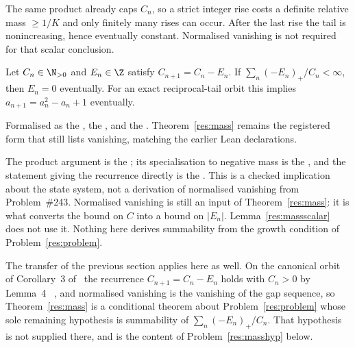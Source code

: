 \documentclass[11pt]{article}
\begin{document}
\noindent The same product already caps $C_n$, so a strict integer rise costs a
definite relative mass $\ge 1/K$ and only finitely many rises can occur.  After
the last rise the tail is nonincreasing, hence eventually constant.  Normalised
vanishing is not required for that scalar conclusion.

\begin{lemma}\label{res:massscalar}
Let \(C_n\in\N_{>0}\) and \(E_n\in\Z\) satisfy \(C_{n+1}=C_n-E_n\).  If
\(\sum_n(-E_n)_+/C_n<\infty\), then \(E_n=0\) eventually.  For an exact
reciprocal-tail orbit this implies \(a_{n+1}=a_n^2-a_n+1\) eventually.
\end{lemma}

\noindent Formalised as the
, the
, and the
.  Theorem~\ref{res:mass} remains the registered
form that still lists vanishing, matching the earlier Lean declarations.

\noindent The product argument is the
; its specialisation to negative mass is the
, and the statement giving the recurrence directly is
the
.  This is a checked implication about
the state system, not a derivation of normalised vanishing from
Problem~\#243.  Normalised vanishing is still an input of
Theorem~\ref{res:mass}: it is what converts the bound on $C$ into a bound on
$|E_n|$.  Lemma~\ref{res:massscalar} does not use it.  Nothing here derives
summability from the growth condition of Problem~\ref{res:problem}.

The transfer of the previous section applies here as well.  On the canonical
orbit of Corollary~3 of~\cite[p.~9]{koizumi2025} the recurrence
$C_{n+1}=C_n-E_n$ holds with $C_n>0$ by Lemma~4
~\cite[p.~11]{koizumi2025}, and normalised vanishing is the vanishing of
the gap sequence, so Theorem~\ref{res:mass} is a conditional theorem about
Problem~\ref{res:problem} whose sole remaining hypothesis is summability of
$\sum_n(-E_n)_+/C_n$.  That hypothesis is not supplied there, and is the
content of Problem~\ref{res:masshyp} below.
\end{document}
